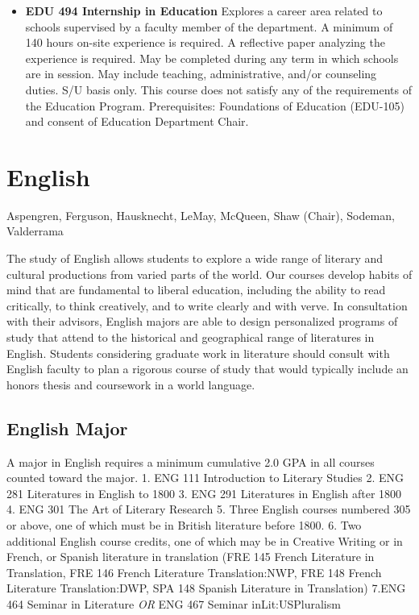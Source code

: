 \documentclass[
  letterpaper,
]{scrbook}
\begin{document}
\begin{itemize}
\item
  \textbf{EDU 494 Internship in Education} Explores a career area
  related to schools supervised by a faculty member of the department. A
  minimum of 140 hours on-site experience is required. A reflective
  paper analyzing the experience is required. May be completed during
  any term in which schools are in session. May include teaching,
  administrative, and/or counseling duties. S/U basis only. This course
  does not satisfy any of the requirements of the Education Program.
  Prerequisites: Foundations of Education (EDU-105) and consent of
  Education Department Chair.
\end{itemize}

\section{English}\label{sec-english}

Aspengren, Ferguson, Hausknecht, LeMay, McQueen, Shaw (Chair), Sodeman,
Valderrama

The study of English allows students to explore a wide range of literary
and cultural productions from varied parts of the world. Our courses
develop habits of mind that are fundamental to liberal education,
including the ability to read critically, to think creatively, and to
write clearly and with verve. In consultation with their advisors,
English majors are able to design personalized programs of study that
attend to the historical and geographical range of literatures in
English. Students considering graduate work in literature should consult
with English faculty to plan a rigorous course of study that would
typically include an honors thesis and coursework in a world language.

\subsection{English Major}\label{english-major}

A major in English requires a minimum cumulative 2.0 GPA in all courses
counted toward the major. 1. ENG 111 Introduction to Literary Studies 2.
ENG 281 Literatures in English to 1800 3. ENG 291 Literatures in English
after 1800 4. ENG 301 The Art of Literary Research 5. Three English
courses numbered 305 or above, one of which must be in British
literature before 1800. 6. Two additional English course credits, one of
which may be in Creative Writing or in French, or Spanish literature in
translation (FRE 145 French Literature in Translation, FRE 146 French
Literature Translation:NWP, FRE 148 French Literature Translation:DWP,
SPA 148 Spanish Literature in Translation) 7.ENG 464 Seminar in
Literature \emph{OR} ENG 467 Seminar inLit:USPluralism
\end{document}
